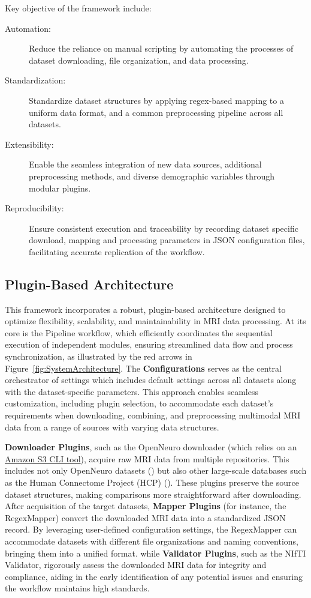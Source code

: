 Key objective of the framework include: 
\begin{description}
    \item[Automation:] Reduce the reliance on manual scripting by automating the processes of dataset downloading, file organization, and data processing.
    \item[Standardization:] Standardize dataset structures by applying regex-based mapping to a uniform data format, and a common preprocessing pipeline across all datasets.
    \item[Extensibility:] Enable the seamless integration of new data sources, additional preprocessing methods, and diverse demographic variables through modular plugins.
    \item[Reproducibility:] Ensure consistent execution and traceability by recording dataset specific download, mapping and processing parameters in JSON configuration files, facilitating accurate replication of the workflow.
\end{description}


\subsection{Plugin-Based Architecture}

This framework incorporates a robust, plugin-based architecture designed to optimize flexibility, scalability, and maintainability in MRI data processing. 
At its core is the Pipeline workflow, which efficiently coordinates the sequential execution of independent modules, ensuring streamlined data flow and 
process synchronization, as illustrated by the red arrows in Figure~\ref{fig:SystemArchitecture}.
The \textbf{Configurations} serves as the central orchestrator of settings which includes default settings across all datasets along with the dataset-specific parameters. 
This approach enables seamless customization, including plugin selection, to accommodate each dataset's requirements when downloading, combining, and preprocessing 
multimodal MRI data from a range of sources with varying data structures.

\textbf{Downloader Plugins}, such as the OpenNeuro downloader (which relies on an \href{https://docs.aws.amazon.com/cli/latest/reference/s3/}{Amazon S3 CLI tool}), 
acquire raw MRI data from multiple repositories. This includes not only OpenNeuro datasets (\cite{markiewicz2021openneuro}) but also other large-scale databases such as the 
Human Connectome Project (HCP) (\cite{van2013wu}). These plugins preserve the source dataset structures, making comparisons more straightforward after downloading.
After acquisition of the target datasets, \textbf{Mapper Plugins} (for instance, the RegexMapper) convert the downloaded MRI data into a standardized JSON record. 
By leveraging user-defined configuration settings, the RegexMapper can accommodate datasets with different file organizations and naming conventions, bringing them into a unified format.
while \textbf{Validator Plugins}, such as the NIfTI Validator, rigorously assess the downloaded MRI data for integrity and compliance, aiding in the early identification of any potential issues 
and ensuring the workflow maintains high standards.

